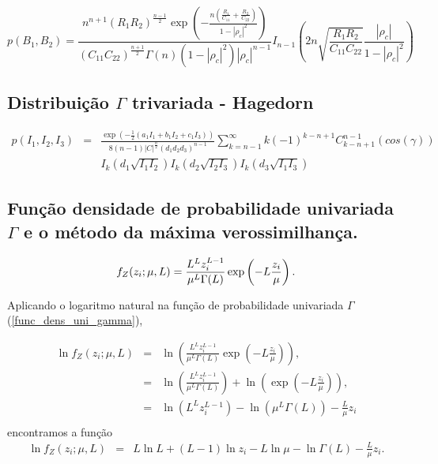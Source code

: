 \documentclass[remotesensing,article,submit,moreauthors,pdftex]{Definitions/mdpi}
\begin{document}
\begin{equation}\label{eqn62}
	p(B_1,B_2)=\frac{n^{n+1}\left(R_1R_2\right)^{\frac{n-1}{2}}\exp\left(-\frac{n(\frac{R_1}{C_{11}}+\frac{R_2}{C_{22}})}{1-|\rho_c|^2}\right)}{(C_{11}C_{22})^{\frac{n+1}{2}}\Gamma(n)(1-|\rho_c|^2)|\rho_c|^{n-1}}I_{n-1}\left(2n\sqrt{\frac{R_1R_2}{C_{11}C_{22}}}\frac{|\rho_c|}{1-|\rho_c|^2}\right)
\end{equation}
\subsection{Distribuição $\Gamma$ trivariada - Hagedorn }
\begin{equation}\label{eqn62}
\begin{array}{ccc}
	p(I_1,I_2,I_3)&=& \frac{\exp(-\frac{1}{2}(a_1I_1+b_1I_2+c_1I_3))}{8(n-1)|C|^{\frac{n}{2}}(d_1d_2d_3)^{n-1}}\sum_{k=n-1}^{\infty}k(-1)^{k-n+1}C_{k-n+1}^{n-1}(cos(\gamma))\\
	&&I_k(d_1\sqrt{I_1I_2})I_k(d_2\sqrt{I_2I_3})I_k(d_3\sqrt{I_1I_3})
\end{array}
\end{equation}
\subsection{Função densidade de probabilidade univariada $\Gamma$ e o método da máxima verossimilhança.}
\begin{equation}\label{func_dens_uni_gamma}
	f_{Z}(z_{i};\mu,L)=\frac{L^{L}z_{i}^{L-1}}{\mu^{L}\Gamma(L)} \exp\left(-L\frac{z_{i}}{\mu}\right). \\
\end{equation}

Aplicando o logaritmo natural na função de probabilidade univariada $\Gamma$ (\ref{func_dens_uni_gamma}),

\begin{equation}\nonumber
\begin{array}{ccc}
	\ln f_{Z}(z_{i};\mu,L)&=&\ln \left(\frac{L^{L}z_{i}^{L-1}}{\mu^{L}\Gamma(L)} \exp\left(-L\frac{z_{i}}{\mu}\right)\right), \\
	                                         &=&\ln \left(\frac{L^{L}z_{i}^{L-1}}{\mu^{L}\Gamma(L)}\right) + \ln\left(\exp\left(-L\frac{z_{i}}{\mu}\right)\right), \\
	                                         &=&\ln \left(L^{L}z_{i}^{L-1} \right)-\ln\left(\mu^{L}\Gamma(L)\right) -\frac{L}{\mu} z_i\\
\end{array}
\end{equation}
encontramos a função
\begin{equation}\label{func_max_ver_uni_gamma}
\begin{array}{ccc}
	\ln f_{Z}(z_{i};\mu,L)&=& L\ln L +(L - 1) \ln z_{i}-L \ln \mu-\ln \Gamma(L) -\frac{L}{\mu} z_i.\\
\end{array}
\end{equation}
\end{document}
